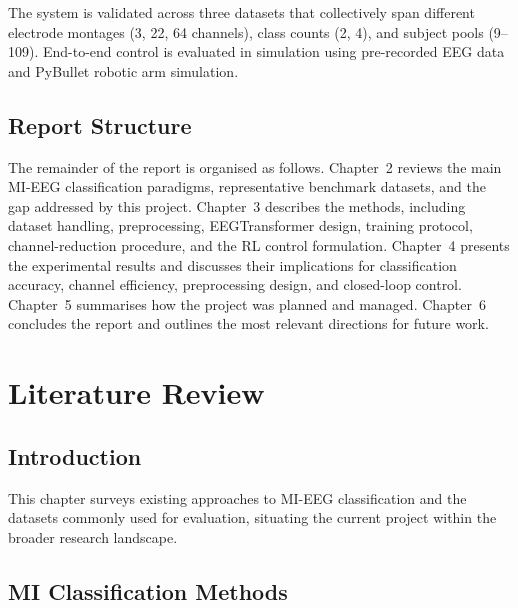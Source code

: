 \documentclass[12pt, a4paper]{article}
\begin{document}
The system is validated across three datasets that collectively span different electrode montages (3, 22, 64 channels), class counts (2, 4), and subject pools (9--109). End-to-end control is evaluated in simulation using pre-recorded EEG data and PyBullet robotic arm simulation.

\subsection{Report Structure}

The remainder of the report is organised as follows. Chapter~2 reviews the main MI-EEG classification paradigms, representative benchmark datasets, and the gap addressed by this project. Chapter~3 describes the methods, including dataset handling, preprocessing, EEGTransformer design, training protocol, channel-reduction procedure, and the RL control formulation. Chapter~4 presents the experimental results and discusses their implications for classification accuracy, channel efficiency, preprocessing design, and closed-loop control. Chapter~5 summarises how the project was planned and managed. Chapter~6 concludes the report and outlines the most relevant directions for future work.

\section{Literature Review}

\subsection{Introduction}

This chapter surveys existing approaches to MI-EEG classification and the datasets commonly used for evaluation, situating the current project within the broader research landscape.

\subsection{MI Classification Methods}
\end{document}
